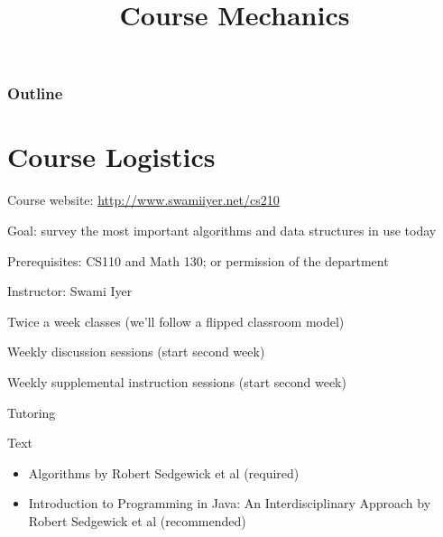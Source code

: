 \documentclass[8pt,a4paper,compress]{beamer}
\title{Course Mechanics}
\date{}
\begin{document}
\begin{frame}
\vfill
\titlepage
\end{frame}

\begin{frame}
\frametitle{Outline}
\tableofcontents
\end{frame}

\section{Course Logistics}
\begin{frame}[fragile]
\pause

Course website: \href{http://www.swamiiyer.net/cs210}{http://www.swamiiyer.net/cs210 \ExternalLink}

\pause
\bigskip

Goal: survey the most important algorithms and data structures in use today

\pause
\bigskip

Prerequisites: CS110 and Math 130; or permission of the department

\pause
\bigskip

Instructor: Swami Iyer

\pause
\bigskip

Twice a week classes (we'll follow a flipped classroom model)

\pause
\bigskip

Weekly discussion sessions (start second week)

\pause
\bigskip

Weekly supplemental instruction sessions (start second week)

\pause
\bigskip

Tutoring

\pause
\bigskip

Text
\begin{itemize}
\item Algorithms by Robert Sedgewick et al (required)
\item Introduction to Programming in Java: An Interdisciplinary Approach  by Robert Sedgewick et al (recommended)
\end{itemize}
\end{frame}
\end{document}
